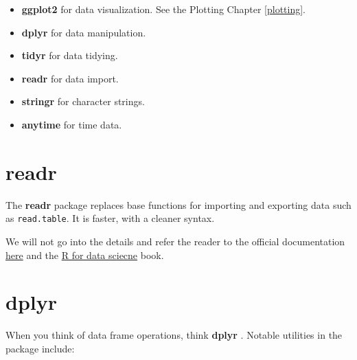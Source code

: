 \documentclass[]{book}
\providecommand{\tightlist}{%
  \setlength{\itemsep}{0pt}\setlength{\parskip}{0pt}}
\theoremstyle{definition}
\theoremstyle{definition}
\theoremstyle{definition}
\theoremstyle{remark}
\begin{document}
\begin{itemize}
\tightlist
\item
  \textbf{ggplot2} for data visualization. See the Plotting Chapter
  \ref{plotting}.
\item
  \textbf{dplyr} for data manipulation.
\item
  \textbf{tidyr} for data tidying.
\item
  \textbf{readr} for data import.
\item
  \textbf{stringr} for character strings.
\item
  \textbf{anytime} for time data.
\end{itemize}

\section{readr}\label{readr}

The \textbf{readr} package \citep{readr} replaces base functions for
importing and exporting data such as \texttt{read.table}. It is faster,
with a cleaner syntax.

We will not go into the details and refer the reader to the official
documentation
\href{http://readr.tidyverse.org/articles/readr.html}{here} and the
\href{http://r4ds.had.co.nz/data-import.html}{R for data sciecne} book.

\section{dplyr}\label{dplyr}

When you think of data frame operations, think \textbf{dplyr}
\citep{dplyr}. Notable utilities in the package include:
\end{document}
